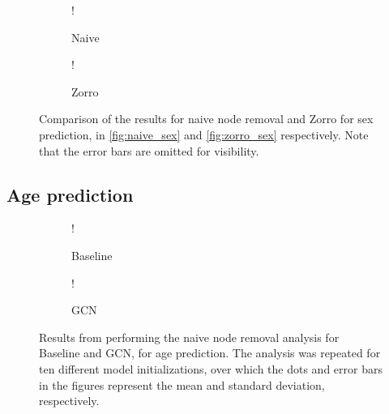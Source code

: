 \begin{figure}[!htbp]
    \centering
        \begin{subfigure}{.5\textwidth}
            \centering
            \begin{center}
                \resizebox {1.0\linewidth} {!} {
                    
                }
            \end{center}
            \caption{Naive}
            \label{fig:comparison_sex_naive}
        \end{subfigure}%
        \begin{subfigure}{.5\textwidth}
            \centering
            \begin{center}
                \resizebox {1.0\linewidth} {!} {
                    
                }
            \end{center}
            \caption{Zorro}
            \label{fig:comparison_sex_zorro}
        \end{subfigure}
    \caption{Comparison of the results for naive node removal and Zorro for sex prediction, in \cref{fig:naive_sex} and \cref{fig:zorro_sex} respectively. Note that the error bars are omitted for visibility.}
    \label{fig:comparison_sex}
\end{figure}



\subsection{Age prediction}

\begin{figure}[!htbp]
    \centering
        \begin{subfigure}{.5\textwidth}
            \centering
            \begin{center}
                \resizebox {1.0\linewidth} {!} {
                    
                }
            \end{center}
            \caption{Baseline}
            \label{fig:naive_age_baseline}
        \end{subfigure}%
        \begin{subfigure}{.5\textwidth}
            \centering
            \begin{center}
                \resizebox {1.0\linewidth} {!} {
                    
                }
            \end{center}
            \caption{GCN}
            \label{fig:naive_age_gcn}
        \end{subfigure}
    \caption{Results from performing the naive node removal analysis for Baseline and GCN, for age prediction. The analysis was repeated for ten different model initializations, over which the dots and error bars in the figures represent the mean and standard deviation, respectively.}
    \label{fig:naive_age}
\end{figure}

